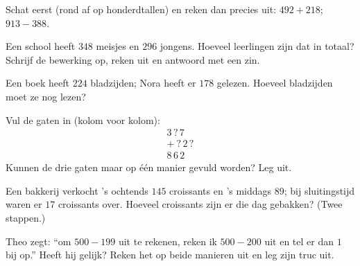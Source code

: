 \begin{exercise}[$\star$]\label{exo:g3:addsub:6}
Schat eerst (rond af op honderdtallen) en reken dan precies uit:
$492 + 218$; \quad $913 - 388$.
\end{exercise}

\begin{exercise}[$\star$]\label{exo:g3:addsub:7}
Een school heeft $348$ meisjes en $296$ jongens. Hoeveel leerlingen zijn
dat in totaal? Schrijf de bewerking op, reken uit en antwoord met een
zin.
\end{exercise}

\begin{exercise}[$\star$]\label{exo:g3:addsub:8}
Een boek heeft $224$ bladzijden; Nora heeft er $178$ gelezen. Hoeveel
bladzijden moet ze nog lezen?
\end{exercise}

\begin{exercise}[$\star$]\label{exo:g3:addsub:9}
Vul de gaten in (kolom voor kolom):
\[
\begin{array}{r}
3\,?\,7 \\
+\ ?\,2\,? \\
\hline
8\,6\,2
\end{array}
\]
Kunnen de drie gaten maar op één manier gevuld worden? Leg uit.
\end{exercise}

\begin{exercise}[$\star\star$]\label{exo:g3:addsub:10}
Een bakkerij verkocht 's ochtends $145$ croissants en 's middags $89$;
bij sluitingstijd waren er $17$ croissants over. Hoeveel croissants zijn
er die dag gebakken? (Twee stappen.)
\end{exercise}

\begin{exercise}[$\star\star$]\label{exo:g3:addsub:11}
Theo zegt: ``om $500 - 199$ uit te rekenen, reken ik $500 - 200$ uit en
tel er dan $1$ bij op.'' Heeft hij gelijk? Reken het op beide manieren
uit en leg zijn truc uit.
\end{exercise}
